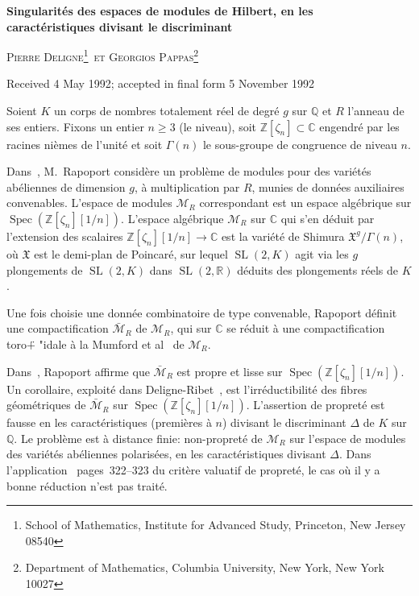 \documentclass[11pt,a4paper]{article}
\theoremstyle{plain}
\theoremstyle{definition}
\DeclareMathOperator{\Spec}{Spec}
\DeclareMathOperator{\SL}{SL}
\begin{document}
\begin{center}
{\Large\bfseries Singularit\'es des espaces de modules de Hilbert, en les\\[0.3em]
caract\'eristiques divisant le discriminant}\par
\bigskip
{\scshape Pierre Deligne\footnote{School of Mathematics, Institute for Advanced Study,
Princeton, New Jersey 08540}\ et Georgios Pappas\footnote{Department of Mathematics,
Columbia University, New York, New York 10027}}\par
\smallskip
Received 4 May 1992; accepted in final form 5 November 1992
\end{center}

\thispagestyle{empty}
\setcounter{footnote}{0}

\bigskip

Soient $K$ un corps de nombres totalement r\'eel de degr\'e $g$ sur $\mathbb{Q}$ et $R$
l'anneau de ses entiers. Fixons un entier $n\geq 3$ (le niveau), soit
$\mathbb{Z}[\zeta_n]\subset\mathbb{C}$ engendr\'e par les racines ni\`emes de l'unit\'e et soit
$\Gamma(n)$ le sous-groupe de congruence de niveau $n$.

Dans~\cite{Rapoport}, M.~Rapoport consid\`ere un probl\`eme de modules pour
des vari\'et\'es ab\'eliennes de dimension $g$, \`a multiplication par $R$, munies de
donn\'ees auxiliaires convenables. L'espace de modules $\mathscr{M}_R$ correspondant
est un espace alg\'ebrique sur $\Spec(\mathbb{Z}[\zeta_n][1/n])$. L'espace alg\'ebrique
$\mathscr{M}_R$ sur $\mathbb{C}$ qui s'en d\'eduit par l'extension des scalaires
$\mathbb{Z}[\zeta_n][1/n]\to\mathbb{C}$ est la vari\'et\'e de Shimura $\mathfrak{X}^g/\Gamma(n)$,
o\`u $\mathfrak{X}$ est le demi-plan de Poincar\'e, sur lequel $\SL(2,K)$ agit via
les $g$ plongements de $\SL(2,K)$ dans $\SL(2,\mathbb{R})$ d\'eduits des plongements
r\'eels de $K$.

Une fois choisie une donn\'ee combinatoire de type convenable, Rapoport
d\'efinit une compactification $\bar{\mathscr{M}}_R$ de $\mathscr{M}_R$, qui sur $\mathbb{C}$ se
r\'eduit \`a une compactification toro\"  + "{i}dale \`a la Mumford et al~\cite{AMRT} de $\mathscr{M}_R$.

Dans~\cite{Rapoport}, Rapoport affirme que $\bar{\mathscr{M}}_R$ est propre et lisse
sur $\Spec(\mathbb{Z}[\zeta_n][1/n])$. Un corollaire, exploit\'e dans
Deligne-Ribet~\cite{DeligneRibet}, est l'irr\'eductibilit\'e des fibres g\'eom\'etriques
de $\bar{\mathscr{M}}_R$ sur $\Spec(\mathbb{Z}[\zeta_n][1/n])$. L'assertion de propret\'e est
fausse en les caract\'eristiques (premi\`eres \`a $n$) divisant le discriminant $\Delta$ de $K$
sur $\mathbb{Q}$. Le probl\`eme est \`a distance finie: non-propret\'e de $\mathscr{M}_R$ sur l'espace de
modules des vari\'et\'es ab\'eliennes polaris\'ees, en les caract\'eristiques divisant $\Delta$.
Dans l'application~\cite{Rapoport} pages~322--323 du crit\`ere valuatif de propret\'e, le cas
o\`u il y a bonne r\'eduction n'est pas trait\'e.
\end{document}
